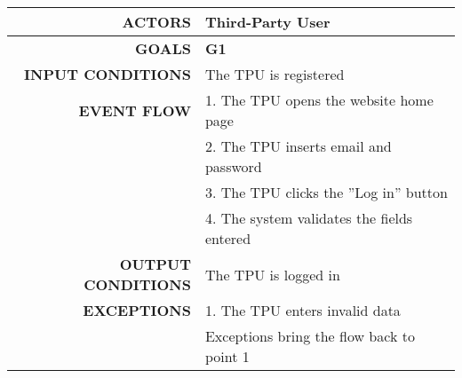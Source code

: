 \begin{table}[h!]
\begin{tabular}{|r|p{3in}|}
\hline
\textbf{ACTORS} & Third-Party User\\
\hline
\textbf{GOALS} & \textbf{G1}\\
\hline
\textbf{INPUT CONDITIONS} & The TPU is registered\\
\hline
\textbf{EVENT FLOW} 
&1. The TPU opens the website home page\\
&2. The TPU inserts email and password\\
&3. The TPU clicks the ''Log in'' button\\
&4. The system validates the fields entered\\
\hline
\textbf{OUTPUT CONDITIONS} & The TPU is logged in \\
\hline
\textbf{EXCEPTIONS} 
&1. The TPU enters invalid data  \\
&Exceptions bring the flow back to point 1\\
\hline
\end{tabular}
\end{table}